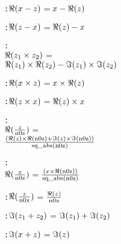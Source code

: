 \begin{alltt}
  :  \(\Reonefn{\opdifferencetwofn{x}{z}}\) \(=\) \(\opdifferencetwofn{x}{\Reonefn{z}}\)\vspace*{\pvsdeclspacing}

  :  \(\Reonefn{\opdifferencetwofn{z}{x}}\) \(=\) \(\opdifferencetwofn{\Reonefn{z}}{x}\)\vspace*{\pvsdeclspacing}

  : 
    \(\Reonefn{\optimestwofn{z\sb{1}}{z\sb{2}}}\) \(=\)
     \(\opdifferencetwofn{\optimestwofn{\Reonefn{z\sb{1}}}{\Reonefn{z\sb{2}}}}{\optimestwofn{\Imonefn{z\sb{1}}}{\Imonefn{z\sb{2}}}}\)\vspace*{\pvsdeclspacing}

  :  \(\Reonefn{\optimestwofn{x}{z}}\) \(=\) \(\optimestwofn{x}{\Reonefn{z}}\)\vspace*{\pvsdeclspacing}

  :  \(\Reonefn{\optimestwofn{z}{x}}\) \(=\) \(\optimestwofn{\Reonefn{z}}{x}\)\vspace*{\pvsdeclspacing}

  : 
    \(\Reonefn{\opdividetwofn{z}{\pvsid{n0z}}}\) \(=\)
     \(\opdividetwofn{\pvsid{(}\opplustwofn{\optimestwofn{\Reonefn{z}}{\Reonefn{\pvsid{n0z}}}}{\optimestwofn{\Imonefn{z}}{\Imonefn{\pvsid{n0z}}}}\pvsid{)}}{\pvsid{sq\_abs}\pvsid{(}\pvsid{n0z}\pvsid{)}}\)\vspace*{\pvsdeclspacing}

  : 
    \(\Reonefn{\opdividetwofn{x}{\pvsid{n0z}}}\) \(=\) \(\opdividetwofn{\pvsid{(}\optimestwofn{x}{\Reonefn{\pvsid{n0z}}}\pvsid{)}}{\pvsid{sq\_abs}\pvsid{(}\pvsid{n0z}\pvsid{)}}\)\vspace*{\pvsdeclspacing}

  :  \(\Reonefn{\opdividetwofn{z}{\pvsid{n0x}}}\) \(=\) \(\opdividetwofn{\Reonefn{z}}{\pvsid{n0x}}\)\vspace*{\pvsdeclspacing}

  :  \(\Imonefn{\opplustwofn{z\sb{1}}{z\sb{2}}}\) \(=\) \(\opplustwofn{\Imonefn{z\sb{1}}}{\Imonefn{z\sb{2}}}\)\vspace*{\pvsdeclspacing}

  :  \(\Imonefn{\opplustwofn{x}{z}}\) \(=\) \(\Imonefn{z}\)\vspace*{\pvsdeclspacing}


\end{alltt}
